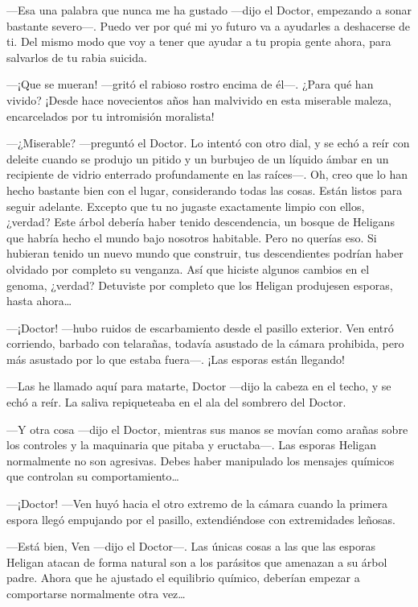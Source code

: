 ---Esa una palabra que nunca me ha gustado ---dijo el Doctor, empezando
a sonar bastante severo---. Puedo ver por qué mi yo futuro va a
ayudarles a deshacerse de ti. Del mismo modo que voy a tener que ayudar
a tu propia gente ahora, para salvarlos de tu rabia suicida.

---¡Que se mueran! ---gritó el rabioso rostro encima de él---. ¿Para qué
han vivido? ¡Desde hace novecientos años han malvivido en esta miserable
maleza, encarcelados por tu intromisión moralista!

---¿Miserable? ---preguntó el Doctor. Lo intentó con otro dial, y se
echó a reír con deleite cuando se produjo un pitido y un burbujeo de un
líquido ámbar en un recipiente de vidrio enterrado profundamente en las
raíces---. Oh, creo que lo han hecho bastante bien con el lugar,
considerando todas las cosas. Están listos para seguir adelante. Excepto
que tu no jugaste exactamente limpio con ellos, ¿verdad? Este árbol
debería haber tenido descendencia, un bosque de Heligans que habría
hecho el mundo bajo nosotros habitable. Pero no querías eso. Si hubieran
tenido un nuevo mundo que construir, tus descendientes podrían haber
olvidado por completo su venganza. Así que hiciste algunos cambios en el
genoma, ¿verdad? Detuviste por completo que los Heligan produjesen
esporas, hasta ahora\ldots{}

---¡Doctor! ---hubo ruidos de escarbamiento desde el pasillo exterior.
Ven entró corriendo, barbado con telarañas, todavía asustado de la
cámara prohibida, pero más asustado por lo que estaba fuera---. ¡Las
esporas están llegando!

---Las he llamado aquí para matarte, Doctor ---dijo la cabeza en el
techo, y se echó a reír. La saliva repiqueteaba en el ala del sombrero
del Doctor.

---Y otra cosa ---dijo el Doctor, mientras sus manos se movían como
arañas sobre los controles y la maquinaria que pitaba y eructaba---. Las
esporas Heligan normalmente no son agresivas. Debes haber manipulado los
mensajes químicos que controlan su comportamiento\ldots{}

---¡Doctor! ---Ven huyó hacia el otro extremo de la cámara cuando la
primera espora llegó empujando por el pasillo, extendiéndose con
extremidades leñosas.

---Está bien, Ven ---dijo el Doctor---. Las únicas cosas a las que las
esporas Heligan atacan de forma natural son a los parásitos que amenazan
a su árbol padre. Ahora que he ajustado el equilibrio químico, deberían
empezar a comportarse normalmente otra vez\ldots{}

